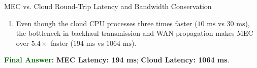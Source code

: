 \documentclass[11pt,a4paper,openany]{report}
\newcommand{\Answer}{\par\textbf{\textcolor{darkgreen}{Final Answer:}} }
\begin{document}
\begin{solved}{MEC vs. Cloud Round-Trip Latency and Bandwidth Conservation}
\begin{enumerate}[leftmargin=*]
  \begin{equation}
  T_{\text{trans, cloud}} = \frac{S}{R_{\text{cloud}}} = \frac{16\text{ Mb}}{20\text{ Mbps}} = 0.800\text{ s} = 800\text{ ms}
  \end{equation}
  \begin{equation}
  T_{\text{total, Cloud}} = T_{\text{radio}} + T_{\text{trans, radio}} + T_{\text{wan}} + T_{\text{trans, cloud}} + T_{\text{proc, Cloud}} + T_{\text{wan}} + T_{\text{radio}}
  \end{equation}
  \begin{equation}
  T_{\text{total, Cloud}} = 2 + 160 + 45 + 800 + 10 + 45 + 2 = 1064\text{ ms}
  \end{equation}
  \item Even though the cloud CPU processes three times faster ($10\text{ ms}$ vs $30\text{ ms}$), the bottleneck in backhaul transmission and WAN propagation makes MEC over $5.4\times$ faster ($194\text{ ms}$ vs $1064\text{ ms}$).
\end{enumerate}
\Answer \textbf{MEC Latency: 194 ms}; \textbf{Cloud Latency: 1064 ms}.
\end{solved}
\end{document}
